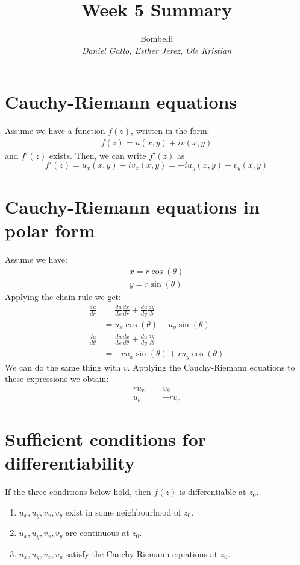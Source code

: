 \documentclass{article}
\title{Week 5 Summary}
\author{
    Bombelli \\
    \textit{Daniel Gallo, Esther Jerez, Ole Kristian}
}
\begin{document}
    \maketitle
    \noindent
    
    \section{Cauchy-Riemann equations}
    Assume we have a function $f(z)$, written in the form:
    \begin{align*}
        f(z) = u(x,y) + iv(x,y)
    \end{align*}
    and $f'(z)$ exists. Then, we can write $f'(z)$ as
    \begin{equation*}
        f'(z) = u_x(x,y) + iv_x(x,y) = -iu_y(x,y) + v_y(x,y)
    \end{equation*}
    
    \section{Cauchy-Riemann equations in polar form}
    Assume we have:
    \begin{align*}
        x = r\cos(\theta) \\
        y = r\sin(\theta)
    \end{align*}
    Applying the chain rule we get:
    \begin{align*}
        \frac{du}{dr} &= \frac{du}{dx}\frac{dx}{dr} + \frac{du}{dy}\frac{dy}{dr} \\ 
        &= u_x\cos(\theta)+u_y\sin(\theta) \\
        \frac{du}{d\theta} &= \frac{du}{dx}\frac{dx}{d\theta} + \frac{du}{dy}\frac{dy}{d\theta} \\ 
        &= -ru_x\sin(\theta)+ru_y\cos(\theta)
    \end{align*}
    We can do the same thing with $v$. Applying the Cauchy-Riemann equations to these expressions we obtain:
    \begin{align*}
        ru_r &= v_\theta \\ u_\theta &= -rv_r
    \end{align*}

    \section{Sufficient conditions for differentiability}
    \begin{tcolorbox}[title=Theorem]
        If the three conditions below hold, then $f(z)$ is differentiable at $z_0$. 
        \begin{enumerate}
            \item $u_x, u_y, v_x, v_y$ exist in some neighbourhood of $z_0$.
            \item $u_x, u_y, v_x, v_y$ are continuous at $z_0$.
            \item $u_x, u_y, v_x, v_y$ satisfy the Cauchy-Riemann equations at $z_0$.
        \end{enumerate}
    \end{tcolorbox}
\end{document}

